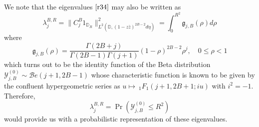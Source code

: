 We note that the eigenvalues $\eqref{r34} $ may also be written as 
\begin{equation}
\label{r39}
\lambda _{j}^{B,R}=\parallel C_{j}^{B}1_{\mathbb{D}_{R}}\parallel _{L^{2}(%
\mathbb{D},(1-z\bar{z})^{2B-2}d\eta )}^{2}=\int_{0}^{R^{2}}\mathfrak{g}%
_{j,B}(\rho )d\rho  
\end{equation}
where 
\begin{equation}
\label{r39dpc}
\mathfrak{g}_{j,B}(\rho )=\frac{\Gamma (2B+j)}{\Gamma (2B-1)\Gamma (j+1)}%
(1-\rho )^{2B-2}\rho ^{j},\quad 0\leq \rho <1  
\end{equation}
which turns out to be the identity function of the Beta distribution $%
\mathcal{Y}_{j,B}^{\left( 0\right) }\sim \mathcal{B}e(j+1,2B-1)$ whose
characteristic function is known to be given by the confluent hypergeometric
series as $u\mapsto {\ }_{1}F_{1}\left( j+1,2B+1;iu\right) $ with $i^{2}=-1.$%
Therefore, 
\begin{equation}
\label{r40}
\lambda _{j}^{B,R}=\Pr (\mathcal{Y}_{j,B}^{\left( 0\right) }\leq R^{2}) 
\end{equation}
would provide us with a probabilistic representation of these eigenvalues.

\smallskip

